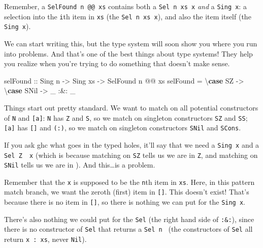 \documentclass[]{article}
\newenvironment{Shaded}{}{}
\newcommand{\DataTypeTok}[1]{\textcolor[rgb]{0.56,0.13,0.00}{#1}}
\newcommand{\FunctionTok}[1]{\textcolor[rgb]{0.02,0.16,0.49}{#1}}
\newcommand{\KeywordTok}[1]{\textcolor[rgb]{0.00,0.44,0.13}{\textbf{#1}}}
\newcommand{\NormalTok}[1]{#1}
\newcommand{\OtherTok}[1]{\textcolor[rgb]{0.00,0.44,0.13}{#1}}
\begin{document}
Remember, a \texttt{SelFound\ n\ @@\ xs} contains both a \texttt{Sel\ n\ xs\ x}
\emph{and} a \texttt{Sing\ x}: a selection into the \texttt{i}th item in
\texttt{xs} (the \texttt{Sel\ n\ xs\ x}), and also the item itself (the
\texttt{Sing\ x}).

We can start writing this, but the type system will soon show you where you run
into problems. And that's one of the best things about type systems! They help
you realize when you're trying to do something that doesn't make sense.

\begin{Shaded}
\begin{Highlighting}[]
\NormalTok{selFound}
\OtherTok{    ::} \DataTypeTok{Sing}\NormalTok{ n}
    \OtherTok{->} \DataTypeTok{Sing}\NormalTok{ xs}
    \OtherTok{->} \DataTypeTok{SelFound}\NormalTok{ n }\FunctionTok{@@}\NormalTok{ xs}
\NormalTok{selFound }\FunctionTok{=}\NormalTok{ \textbackslash{}}\KeywordTok{case}
    \DataTypeTok{SZ} \OtherTok{->}\NormalTok{ \textbackslash{}}\KeywordTok{case}
      \DataTypeTok{SNil} \OtherTok{->}\NormalTok{ _ }\FunctionTok{:&:}\NormalTok{ _}
\end{Highlighting}
\end{Shaded}

Things start out pretty standard. We want to match on all potential constructors
of \texttt{N} and \texttt{{[}a{]}}: \texttt{N} has \texttt{Z} and \texttt{S}, so
we match on singleton constructors \texttt{SZ} and \texttt{SS}; \texttt{{[}a{]}}
has \texttt{{[}{]}} and \texttt{(:)}, so we match on singleton constructors
\texttt{SNil} and \texttt{SCons}.

If you ask ghc what goes in the typed holes, it'll say that we need a
\texttt{Sing\ x} and a
\texttt{Sel\ \textquotesingle{}Z\ \textquotesingle{}{[}{]}\ x} (which is because
matching on \texttt{SZ} tells us we are in \texttt{\textquotesingle{}Z}, and
matching on \texttt{SNil} tells us we are in \texttt{\textquotesingle{}{[}{]}}).
And this\ldots{}is a problem.

Remember that the \texttt{x} is supposed to be the \texttt{n}th item in
\texttt{xs}. Here, in this pattern match branch, we want the zeroth (first) item
in \texttt{{[}{]}}. This doesn't exist! That's because there is no item in
\texttt{{[}{]}}, so there is nothing we can put for the \texttt{Sing\ x}.

There's also nothing we could put for the \texttt{Sel} (the right hand side of
\texttt{:\&:}), since there is no constructor of \texttt{Sel} that returns a
\texttt{Sel\ n\ \textquotesingle{}{[}{]}} (the constructors of \texttt{Sel} all
return \texttt{x\ \textquotesingle{}:\ xs}, never \texttt{Nil}).
\end{document}
